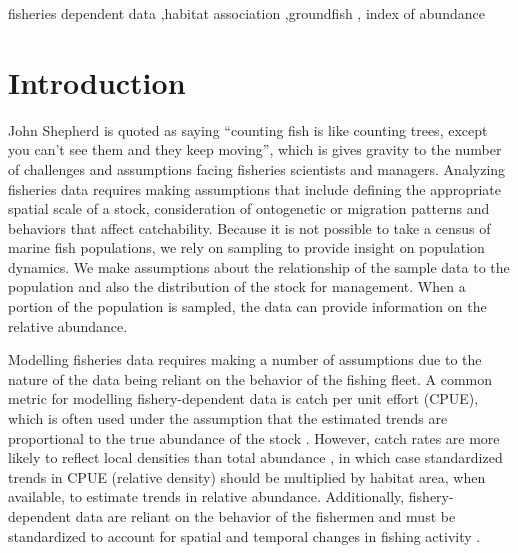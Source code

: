 \documentclass[
  12pt,
  authoryear,
  preprint,
  3p]{elsarticle}
\begin{document}
\begin{frontmatter}
\begin{keyword}
    fisheries dependent data \sep habitat
association \sep groundfish \sep 
    index of abundance
\end{keyword}
\end{frontmatter}\ifdefined\Shaded\renewenvironment{Shaded}{\begin{tcolorbox}[borderline west={3pt}{0pt}{shadecolor}, interior hidden, enhanced, boxrule=0pt, frame hidden, sharp corners, breakable]}{\end{tcolorbox}}\fi

\hypertarget{introduction}{%
\section{Introduction}\label{introduction}}

John Shepherd is quoted as saying ``counting fish is like counting
trees, except you can't see them and they keep moving'', which is gives
gravity to the number of challenges and assumptions facing fisheries
scientists and managers. Analyzing fisheries data requires making
assumptions that include defining the appropriate spatial scale of a
stock, consideration of ontogenetic or migration patterns and behaviors
that affect catchability. Because it is not possible to take a census of
marine fish populations, we rely on sampling to provide insight on
population dynamics. We make assumptions about the relationship of the
sample data to the population and also the distribution of the stock for
management. When a portion of the population is sampled, the data can
provide information on the relative abundance.

Modelling fisheries data requires making a number of assumptions due to
the nature of the data being reliant on the behavior of the fishing
fleet. A common metric for modelling fishery-dependent data is catch per
unit effort (CPUE), which is often used under the assumption that the
estimated trends are proportional to the true abundance of the stock
\citep{Maunder:2004:SCE}. However, catch rates are more likely to
reflect local densities than total abundance
\citep{Haggarty:2006:CIR, Schnute:1995:IEP}, in which case standardized
trends in CPUE (relative density) should be multiplied by habitat area,
when available, to estimate trends in relative abundance. Additionally,
fishery-dependent data are reliant on the behavior of the fishermen and
must be standardized to account for spatial and temporal changes in
fishing activity \citep{Campbell:2004:CSA, Hilborn:1992:QFS}.
\end{document}
